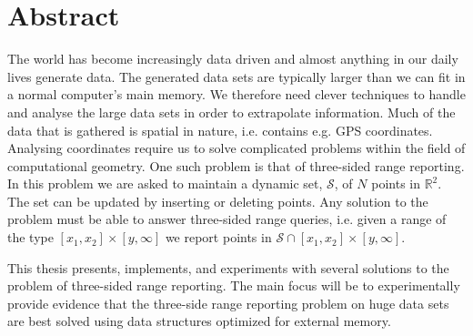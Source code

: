 \documentclass[twoside,11pt,openright]{report}
\begin{document}
\pagestyle{empty} 
\vspace*{\fill}
\clearpage



\chapter*{Abstract}
\pagestyle{plain}

The world has become increasingly data driven and almost anything in our daily lives generate data. The generated data sets are typically larger than we can fit in a normal computer's main memory. We therefore need clever techniques to handle and analyse the large data sets in order to extrapolate information. Much of the data that is gathered is spatial in nature, i.e. contains e.g. GPS coordinates. Analysing coordinates require us to solve complicated problems within the field of computational geometry. One such problem is that of three-sided range reporting. In this problem we are asked to maintain a dynamic set, $\mathcal{S}$, of $N$ points in $\mathbb{R}^2$. The set can be updated by inserting or deleting points. Any solution to the problem must be able to answer three-sided range queries, i.e. given a range of the type $\left[x_1,x_2\right]\times \left[y,\infty\right]$ we report points in $\mathcal{S} \cap \left[x_1,x_2\right]\times \left[y,\infty\right]$.

This thesis presents, implements, and experiments with several solutions to the problem of three-sided range reporting. The main focus will be to experimentally provide evidence that the three-side range reporting problem on huge data sets are best solved using data structures optimized for external memory.
\end{document}
